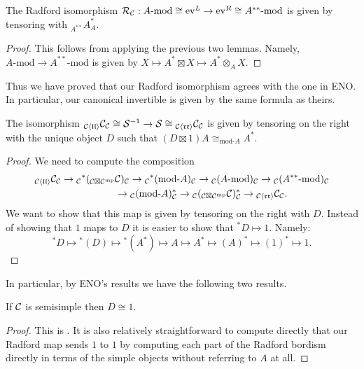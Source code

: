 \documentclass{amsart}
\begin{document}
\begin{lemma}
The Radford isomorphism $\mathcal R_\mathcal C: A\text{-mod} \cong \mathrm{ev}^L \rightarrow \mathrm{ev}^R \cong A^{**}\text{-mod}$ is given by tensoring with ${}_{A^{**}} A^*_{A}$.
\end{lemma}
\begin{proof}
This follows from applying the previous two lemmas.  Namely, $A\text{-mod} \rightarrow A^{**}\text{-mod}$ is given by $X \mapsto A^* \boxtimes X \mapsto A^* \otimes_A X$.
\end{proof}

Thus we have proved that our Radford isomorphism agrees with the one in ENO.  In particular, our canonical invertible is given by the same formula as theirs. 

\begin{lemma}
The isomorphism ${}_{\mathcal C \langle \mathfrak{l l}\rangle}\mathcal C_\mathcal C \cong \mathcal S^{-1} \rightarrow \mathcal S \cong {}_{\mathcal C \langle \mathfrak{r r}\rangle}\mathcal C_\mathcal C$ is given by tensoring on the right with the unique object $D$ such that $(D \boxtimes 1) A \cong_{\text{mod-}A} A^*$. 
\end{lemma}
\begin{proof}
We need to compute the composition
\begin{align*}
{}_{\mathcal C \langle \mathfrak{l l}\rangle}\mathcal C_\mathcal C \rightarrow {}_\mathcal C {}^*({}_{\mathcal C \boxtimes \mathcal C^{\mathrm{mp}}}& \mathcal C)_\mathcal C \rightarrow {}_\mathcal C {}^*(\text{mod-}A)_\mathcal C \rightarrow  {}_\mathcal C (A\text{-mod})_\mathcal C \rightarrow {}_\mathcal C (A^{**}\text{-mod})_\mathcal C 
\\ & \rightarrow  {}_\mathcal C (\text{mod-}A)^*_\mathcal C \rightarrow {}_\mathcal C ({}_{\mathcal C \boxtimes \mathcal C^{\mathrm{mp}}} \mathcal C)^*_\mathcal C \rightarrow {}_{\mathcal C \langle \mathfrak{r r}\rangle}\mathcal C_\mathcal C.
\end{align*}
We want to show that this map is given by tensoring on the right with $D$.  Instead of showing that $1$ maps to $D$ it is easier to show that ${}^*D \mapsto 1$.  Namely:
$${}^*D \mapsto {}^*(D) \mapsto {}^*(A^*) \mapsto A \mapsto A^* \mapsto (A)^* \mapsto (1)^* \mapsto 1.$$
\end{proof}



In particular, by ENO's results we have the following two results.

\begin{lemma}
If $\mathcal C$ is semisimple then $D \cong 1$.
\end{lemma}
\begin{proof}
This is \cite[Cor 6.4]{MR2097289}.  It is also relatively straightforward to compute directly that our Radford map sends $1$ to $1$ by computing each part of the Radford bordism directly in terms of the simple objects without referring to $A$ at all.
\end{proof}
\end{document}
